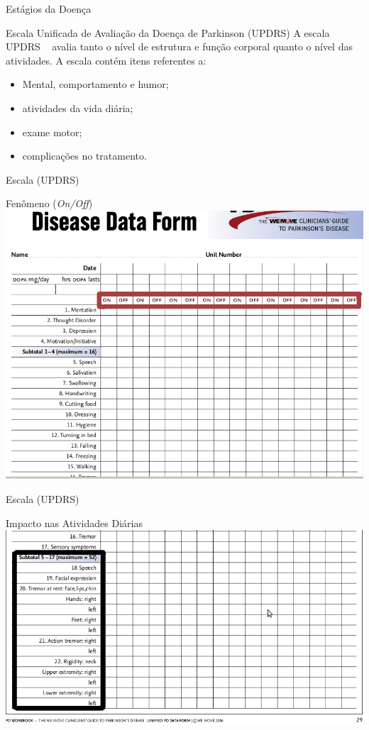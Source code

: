 \documentclass{beamer}
\begin{document}
\begin{frame}{Estágios da Doença}
  \begin{block}{Escala Unificada de Avaliação da Doença de Parkinson (UPDRS)}
    A escala UPDRS ~\cite{updrs87} avalia tanto o nível de estrutura e função corporal quanto o nível das atividades.
      A escala contém itens referentes a:
	\begin{itemize}[<+->]
	 \item Mental, comportamento e humor;
	 \item atividades da vida diária;
	 \item exame motor;
	 \item complicações no tratamento.
	\end{itemize}
 \end{block}
\end{frame}

\begin{frame}{Escala (UPDRS)} 
    \begin{block}{Fenômeno (\textit{On/Off})}
      \center \includegraphics[height=2.4 in]{img/updr1-sel.png}
    \end{block}		
\end{frame}

\begin{frame}{Escala (UPDRS)} 
    \begin{block}{Impacto nas Atividades Diárias}
      \center \includegraphics[height=2.0 in]{img/updr2-sel.png}
    \end{block}
\end{frame}
\end{document}
